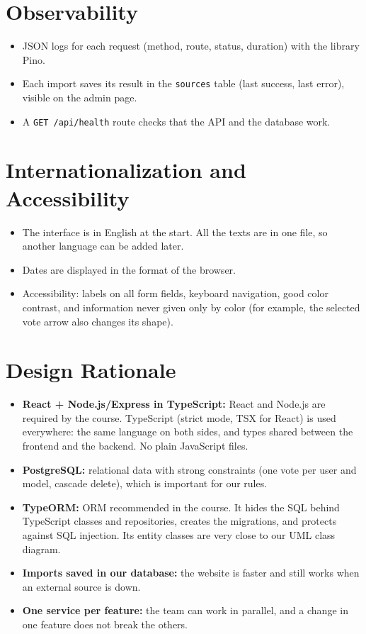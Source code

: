 \documentclass[11pt,a4paper]{article}
\begin{document}
\section{Observability}

\begin{itemize}
  \item JSON logs for each request (method, route, status, duration) with the library Pino.
  \item Each import saves its result in the \texttt{sources} table (last success, last error), visible on the admin page.
  \item A \texttt{GET /api/health} route checks that the API and the database work.
\end{itemize}

\section{Internationalization and Accessibility}

\begin{itemize}
  \item The interface is in English at the start. All the texts are in one file, so another language can be added later.
  \item Dates are displayed in the format of the browser.
  \item Accessibility: labels on all form fields, keyboard navigation, good color contrast, and information never given only by color (for example, the selected vote arrow also changes its shape).
\end{itemize}

\section{Design Rationale}

\begin{itemize}
  \item \textbf{React + Node.js/Express in TypeScript:} React and Node.js are required by the course. TypeScript (strict mode, TSX for React) is used everywhere: the same language on both sides, and types shared between the frontend and the backend. No plain JavaScript files.
  \item \textbf{PostgreSQL:} relational data with strong constraints (one vote per user and model, cascade delete), which is important for our rules.
  \item \textbf{TypeORM:} ORM recommended in the course. It hides the SQL behind TypeScript classes and repositories, creates the migrations, and protects against SQL injection. Its entity classes are very close to our UML class diagram.
  \item \textbf{Imports saved in our database:} the website is faster and still works when an external source is down.
  \item \textbf{One service per feature:} the team can work in parallel, and a change in one feature does not break the others.
\end{itemize}
\end{document}
